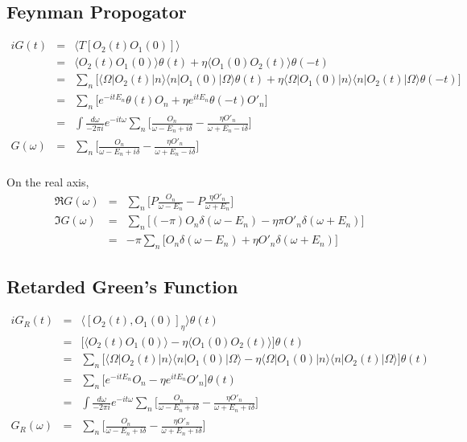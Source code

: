 \documentclass[12pt]{book}
\begin{document}
	\subsection{Feynman Propogator}
	\begin{eqnarray}
		iG(t)&=&\langle T[O_2(t)O_1(0)]\rangle\\
		&=&\langle O_2(t)O_1(0)\rangle\theta(t)+\eta\langle O_1(0)O_2(t)\rangle\theta(-t)\\
		&=&\sum_n\big[\langle \Omega|O_2(t)|n\rangle\langle n|O_1(0)|\Omega\rangle\theta(t)+\eta\langle \Omega|O_1(0)|n\rangle\langle n|O_2(t)|\Omega\rangle\theta(-t)\big]\\
		&=&\sum_n\big[e^{-it E_n}\theta(t)O_n+\eta e^{it E_n}\theta(-t)O'_n\big]\\
		&=&\int\frac{d\omega}{-2\pi i}e^{-it\omega}\sum_{n}\Big[\frac{O_n}{\omega-E_n+i\delta}-\frac{\eta O'_n}{\omega+E_n-i\delta}\Big]\\
		G(\omega)&=&\sum_n\Big[\frac{O_n}{\omega-E_n+i\delta}-\frac{\eta O'_n}{\omega+E_n-i\delta}\Big]\\
	\end{eqnarray}
	
	On the real axis,
	\begin{eqnarray}
		\Re G(\omega)&=&\sum_n\Big[P\frac{O_n}{\omega-E_n}-P\frac{\eta O'_n}{\omega+E_n}\Big]\\
		\Im G(\omega)&=&\sum_{n}\big[(-\pi)O_n\delta(\omega-E_n)-\eta\pi O'_n\delta(\omega+E_n)\big]\\
		&=&-\pi\sum_{n}\big[O_n\delta(\omega-E_n)+\eta O'_n\delta(\omega+E_n)\big]
	\end{eqnarray}
	\subsection{Retarded Green's Function}
	\begin{eqnarray}
		iG_R(t)&=&\langle [O_2(t),O_1(0)]_\eta\rangle\theta(t)\\
		&=&\big[\langle O_2(t)O_1(0)\rangle-\eta\langle O_1(0)O_2(t)\rangle\big]\theta(t)\\
		&=&\sum_{n}\big[\langle\Omega|O_2(t)|n\rangle\langle n|O_1(0)|\Omega\rangle-\eta\langle\Omega|O_1(0)|n\rangle\langle n|O_2(t)|\Omega\rangle\big]\theta(t)\\
		&=&\sum_n\big[e^{-it E_n}O_n-\eta e^{it E_n}O'_n\big]\theta(t)\\
		&=&\int\frac{d\omega}{-2\pi i}e^{-it\omega}\sum_{n}\Big[\frac{O_n}{\omega-E_n+i\delta}-\frac{\eta O'_n}{\omega+E_n+i\delta}\Big]\\
		G_R(\omega)&=&\sum_n\Big[\frac{O_n}{\omega-E_n+i\delta}-\frac{\eta O'_n}{\omega+E_n+i\delta}\Big]
	\end{eqnarray}
	
\end{document}
